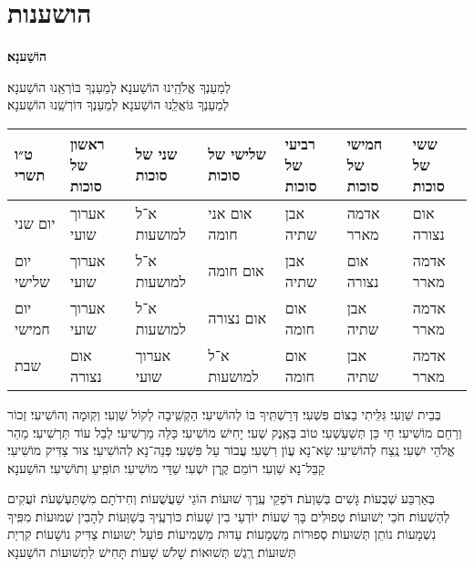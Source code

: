 \documentclass[twoside, openany, parskip=half, 11pt]{book}
\begin{document}
\chapter[הושענות]{ הושענות }
\label{hoshanos}


\begin{Large}
\textbf{
הוֹשַׁענָא׃
}
\end{Large}


לְמַעַנְךָ אֱלֹהֵֽינוּ הוֹשַׁענָא׃ לְמַעַנְךָ בּוֹרְאֵֽנוּ הוֹשַׁענָא׃\\
לְמַעַנְךָ גּוֹאֲלֵֽנוּ הוֹשַׁענָא׃ לְמַעַנְךָ דּוֹרְשֵֽׁנוּ הוֹשַׁענָא׃

\begin{tiny}
\begin{tabular}{>{\centering\arraybackslash}m{}||>{\centering\arraybackslash}m{}|>{\centering\arraybackslash}m{}|>{\centering\arraybackslash}m{}|>{\centering\arraybackslash}m{}|>{\centering\arraybackslash}m{}|>{\centering\arraybackslash}m{}}
ט״ו תשרי & ראשון של סוכות & שני של סוכות & שלישי של סוכות & רביעי של סוכות & חמישי של סוכות & ששי של סוכות \\
\hline \hline
יום שני & אערוך שועי & א־ל למושעות & אום אני חומה & אבן שתיה & אדמה מארר & אום נצורה\\ \hline
יום שלישי & אערוך שועי & א־ל למושעות & אום חומה & אבן שתיה & אום נצורה & אדמה מארר \\ \hline
יום חמישי & אערוך שועי & א־ל למושעות & אום נצורה & אום חומה & אבן שתיה & אדמה מארר\\ \hline
שבת & אום נצורה & אערוך שועי & א־ל למושעות & אום חומה & אבן שתיה & אדמה מארר
\end{tabular}

\end{tiny}


בְּבֵית שַׁוְעִי׃ גִּלִּֽיתִי בַצּוֹם פִּשְׁעִי׃ דְּרַשְׁתִּֽיךָ בּוֹ לְהוֹשִׁיעִי׃ הַקְשִֽׁיבָה לְקוֹל שַׁוְעִי׃ וְקֽוּמָה וְהוֹשִׁיעִי׃ זְכוֹר וְרַחֵם מוֹשִׁיעִי׃ חַי כֵּן תְּשַׁעְשְׁעִי׃ טוֹב בְּאֶֽנֶק שְׁעִי׃ יָחִישׁ מוֹשִׁיעִי׃ כַּלֵּה מַרְשִׁיעִי׃ לְבַל עוֹד תַּרְשִׁיעִי׃ מַהֵר אֱלֹהֵי יִשְׁעִי׃ נֶֽצַח לְהוֹשִׁיעִי׃ שָׂא־נָא עֲוֹן רִשְׁעִי׃ עֲבוֹר עַל פִּשְׁעִי׃ פְּנֵה־נָא לְהוֹשִׁיעִי׃ צוּר צַדִּיק מוֹשִׁיעִי׃ קַבֵּל־נָא שַׁוְעִי׃ רוֹמֵם קֶֽרֶן יִשְׁעִי׃
שַׁדַּי מוֹשִׁיעִי׃ תּוֹפִֽיעַ וְתוֹשִׁיעִי׃ הוֹשַׁענָא׃


בְּאַרְבַּע שְׁבֻעוֹת׃ גָּשִׁים בְּשַׁוְעֹת׃ דֹּפְקֵי עֶֽרֶךְ שׁוּעוֹת׃ הוֹגֵי שַׁעֲשֻׁעוֹת׃ וְחִידֹתָם מִשְׁתַּעְשְׁעֹת׃ זֹעֲקִים לְהַשְׁעוֹת׃ חֹכֵי יְשׁוּעוֹת׃ טְפוּלִים בָּךְ שְׁעוֹת׃ יוֹדְעֵי בִין שָׁעוֹת׃ כּוֹרְעֶֽיךָ בְּשַׁוְּעוֹת׃ לְהָבִין שְׁמוּעוֹת׃ מִפִּֽיךָ נִשְׁמָעוֹת׃ נוֹתֵן תְּשׁוּעוֹת׃ סְפוּרוֹת מַשְׁמָעוֹת׃ עֵדוּת מַשְׁמִיעוֹת׃ פּוֹעֵל יְשׁוּעוֹת׃ צַדִּיק נוֹשָׁעוֹת׃ קִרְיַת תְּשׁוּעוֹת׃ רֶֽגֶשׁ תְּשׁוּאוֹת׃
שָׁלֹשׁ שָׁעוֹת׃
תָּחִישׁ לִתְשׁוּעוֹת הוֹשַׁענָא
\end{document}
